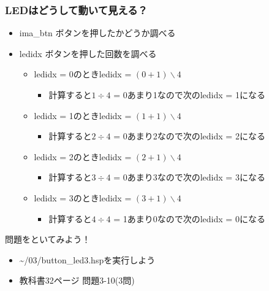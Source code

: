 \documentclass[slide03.tex]{subfiles}
\begin{document}
\begin{frame}
  \frametitle{LEDはどうして動いて見える？}
  \begin{itemize}
    \item ima\_btn ボタンを押したかどうか調べる
    \item ledidx ボタンを押した回数を調べる
    \begin{itemize}
      \item ledidx = 0のときledidx = $(0+1)\backslash4$
      \begin{itemize}
        \item 計算すると$1\div4$ = 0あまり1なので次のledidx = 1になる
      \end{itemize}
      \item ledidx = 1のときledidx = $(1+1)\backslash4$ 
      \begin{itemize}
        \item 計算すると$2\div4$ = 0あまり2なので次のledidx = 2になる 
      \end{itemize}
      \item ledidx = 2のときledidx = $(2+1)\backslash4$ 
      \begin{itemize}
        \item 計算すると$3\div4$ = 0あまり3なので次のledidx = 3になる
      \end{itemize}
      \item ledidx = 3のときledidx = $(3+1)\backslash4$ 
      \begin{itemize}
        \item 計算すると$4\div4$ = 1あまり0なので次のledidx = 0になる
      \end{itemize}
    \end{itemize}
  \end{itemize}
\end{frame}

\begin{frame}
  \begin{exampleblock}{問題をといてみよう！}
    \begin{itemize}
      \item \sim/03/button\_led3.hspを実行しよう
      \item 教科書32ページ 問題3-10(3問)
    \end{itemize}
  \end{exampleblock} 
\end{frame}
\end{document}
